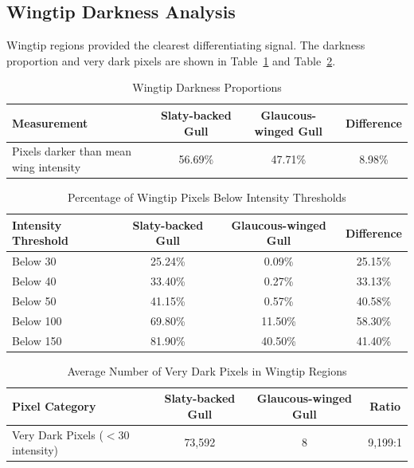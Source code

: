 \documentclass[a4paper,12pt]{report}
\begin{document}
\subsection{Wingtip Darkness Analysis}

Wingtip regions provided the clearest differentiating signal. The darkness proportion and very dark pixels are shown in Table~\ref{tab:darknessproportion} and Table~\ref{tab:darkthresh}.

\begin{table}[H]
    \centering
    \caption{Wingtip Darkness Proportions}
    \label{tab:darknessproportion}
    \begin{tabular}{lccc}
        \toprule
        Measurement & Slaty-backed Gull & Glaucous-winged Gull & Difference \\
        \midrule
        Pixels darker than mean wing intensity & 56.69\% & 47.71\% & 8.98\% \\
        \bottomrule
    \end{tabular}
\end{table}

\begin{table}[H]
    \centering
    \caption{Percentage of Wingtip Pixels Below Intensity Thresholds}
    \label{tab:darkthresh}
    \begin{tabular}{lccc}
        \toprule
        Intensity Threshold & Slaty-backed Gull & Glaucous-winged Gull & Difference \\
        \midrule
        Below 30   & 25.24\% & 0.09\% & 25.15\% \\
        Below 40   & 33.40\% & 0.27\% & 33.13\% \\
        Below 50   & 41.15\% & 0.57\% & 40.58\% \\
        Below 100  & 69.80\% & 11.50\% & 58.30\% \\
        Below 150  & 81.90\% & 40.50\% & 41.40\% \\
        \bottomrule
    \end{tabular}
\end{table}

\begin{table}[H]
    \centering
    \caption{Average Number of Very Dark Pixels in Wingtip Regions}
    \label{tab:darkpixelcount}
    \begin{tabular}{lccc}
        \toprule
        Pixel Category & Slaty-backed Gull & Glaucous-winged Gull & Ratio \\
        \midrule
        Very Dark Pixels ($<$30 intensity) & 73,592 & 8 & 9,199:1 \\
        \bottomrule
    \end{tabular}
\end{table}
\end{document}
